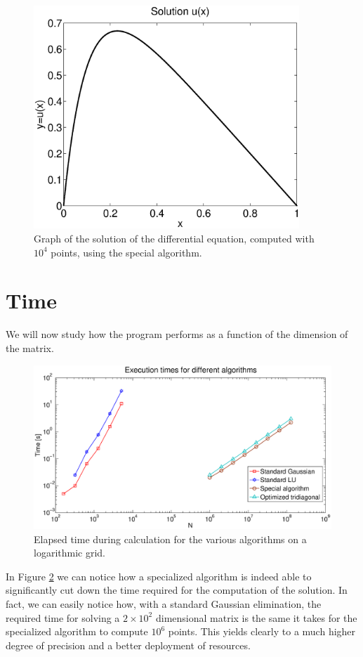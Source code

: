 \documentclass {article}
\begin{document}
\begin{figure}[H]
	\centering
	\includegraphics[width=10cm]{solution}
	\caption{Graph of the solution of the differential equation, computed with $10^4$ points, using the special algorithm.}
	\label{fig:solution}
\end{figure} 

\section{Time}

We will now study how the program performs as a function of the dimension of the matrix. 

\begin{figure}%
	\centering
	\includegraphics[width=18cm]{times}
	\caption{Elapsed time during calculation for the various algorithms on a logarithmic grid.}
	\label{fig:times}
\end{figure}

In Figure \ref{fig:times} we can notice how a specialized algorithm is indeed able to significantly cut down the time required for the computation of the solution.
In fact, we can easily notice how, with a standard Gaussian elimination, the required time for solving a $2 \times 10^2$  dimensional matrix is the same it takes for the specialized algorithm to compute $10^6$ points. This yields clearly to a much higher degree of precision and a better deployment of resources.
\end{document}
